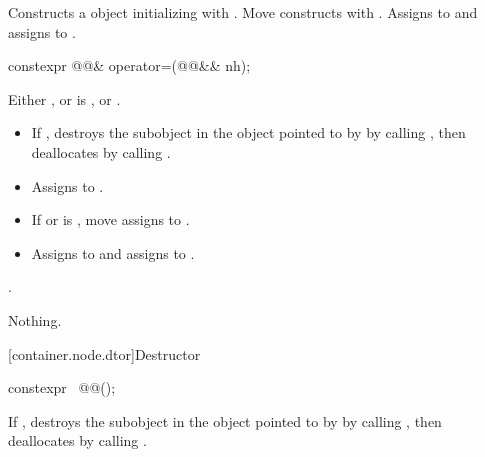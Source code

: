 \begin{itemdescr}
\pnum
\effects
Constructs a  object initializing
 with .  Move constructs  with
.  Assigns  to  and assigns
 to .
\end{itemdescr}

\begin{itemdecl}
constexpr @@& operator=(@@&& nh);
\end{itemdecl}

\begin{itemdescr}
\pnum
\expects
Either , or
is , or .

\pnum
\effects
\begin{itemize}
\item
If , destroys the 
subobject in the  object pointed to by 
by calling , then deallocates  by
calling .
\item
Assigns  to .
\item
If  or 
is , \linebreak
move assigns  to .
\item
Assigns
 to  and assigns  to
.
\end{itemize}

\pnum
\returns
{}.

\pnum
\throws
Nothing.
\end{itemdescr}

[container.node.dtor]{Destructor}

\begin{itemdecl}
constexpr ~@@();
\end{itemdecl}

\begin{itemdescr}
\pnum
\effects
If , destroys the  subobject
in the  object pointed to by  by calling
, then deallocates  by calling
.
\end{itemdescr}

